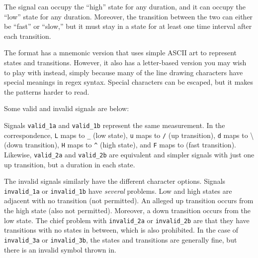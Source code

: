 The signal can occupy the ``high'' state for any duration, and it can
occupy the ``low'' state for any duration. Moreover, the transition
between the two can either be ``fast'' or ``slow,'' but it must stay in
a state for at least one time interval after each transition.

The format has a mnemonic version that uses simple ASCII art to
represent states and transitions. However, it also has a letter-based
version you may wish to play with instead, simply because many of the
line drawing characters have special meanings in regex syntax. Special
characters can be escaped, but it makes the patterns harder to read.

Some valid and invalid signals are below:

\begin{Shaded}
\begin{Highlighting}[]
\OperatorTok{=} 
\OperatorTok{=} 
\OperatorTok{=} 
\OperatorTok{=} 

\OperatorTok{=} 
\OperatorTok{=} 
\OperatorTok{=} 
\OperatorTok{=} 
\OperatorTok{=} 
\OperatorTok{=} 
\OperatorTok{=} 
\OperatorTok{=} 
\end{Highlighting}
\end{Shaded}

Signals \texttt{valid\_1a} and \texttt{valid\_1b} represent the same
measurement. In the correspondence, \texttt{L} maps to \texttt{\_} (low
state), \texttt{u} maps to \texttt{/} (up transition), \texttt{d} maps
to \textbackslash{} (down transition), \texttt{H} maps to \texttt{\^{}}
(high state), and \texttt{F} maps to \texttt{\textbar{}} (fast
transition). Likewise, \texttt{valid\_2a} and \texttt{valid\_2b} are
equivalent and simpler signals with just one up transition, but a
duration in each state.

The invalid signals similarly have the different character options.
Signals \texttt{invalid\_1a} or \texttt{invalid\_1b} have \emph{several}
problems. Low and high states are adjacent with no transition (not
permitted). An alleged up transition occurs from the high state (also
not permitted). Moreover, a down transition occurs from the low state.
The chief problem with \texttt{invalid\_2a} or \texttt{invalid\_2b} are
that they have transitions with no states in between, which is also
prohibited. In the case of \texttt{invalid\_3a} or \texttt{invalid\_3b},
the states and transitions are generally fine, but there is an invalid
symbol thrown in.


